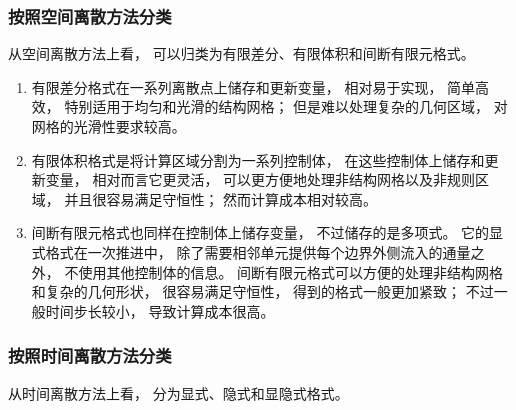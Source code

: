 \subsubsection{按照空间离散方法分类}

从空间离散方法上看，
可以归类为有限差分、有限体积和间断有限元格式。

\begin{enumerate}
  \item 有限差分格式在一系列离散点上储存和更新变量，
        相对易于实现，
        简单高效，
        特别适用于均匀和光滑的结构网格；
        但是难以处理复杂的几何区域，
        对网格的光滑性要求较高。
  \item 有限体积格式是将计算区域分割为一系列控制体，
        在这些控制体上储存和更新变量，
        相对而言它更灵活，
        可以更方便地处理非结构网格以及非规则区域，
        并且很容易满足守恒性；
        然而计算成本相对较高。
  \item 间断有限元格式也同样在控制体上储存变量，
        不过储存的是多项式。
        它的显式格式在一次推进中，
        除了需要相邻单元提供每个边界外侧流入的通量之外，
        不使用其他控制体的信息。
        间断有限元格式可以方便的处理非结构网格和复杂的几何形状，
        很容易满足守恒性，
        得到的格式一般更加紧致；
        不过一般时间步长较小，
        导致计算成本很高。
\end{enumerate}

\subsubsection{按照时间离散方法分类}

从时间离散方法上看，
分为显式、隐式和显隐式格式。

